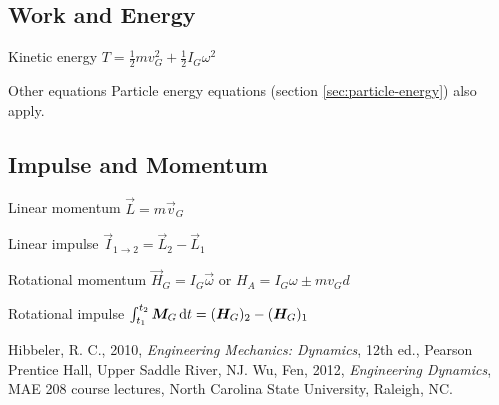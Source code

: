 \documentclass{article}
\begin{document}
\subsection{Work and Energy}
\label{sec:rigid-body-energy}

\begin{description*}
\item[Kinetic energy]
  \(T = \frac12 m v_G^2 + \frac12 I_G \omega^2\)
\item[Other equations] Particle energy equations (section \ref{sec:particle-energy}) also apply.
\end{description*}

\subsection{Impulse and Momentum}
\label{sec:rigid-body-momentum}

\begin{description*}
\item[Linear momentum]
  \(\vec{L} = m\vec{v}_G\)
\item[Linear impulse]
  \(\vec{I}_{1\rightarrow2} = \vec{L}_2 - \vec{L}_1\)
\item[Rotational momentum]
  \(\vec{H}_G = I_G \vec{\omega}\) or
  \(H_A = I_G \omega \pm m v_G d\)
\item[Rotational impulse]
  \(\int_{t_1}^{t_2}\vec{M}_G\dif{t} = (\vec{H}_G)_2 - (\vec{H}_G)_1\)
\end{description*}

\begin{thebibliography}{99}
 Hibbeler, R. C., 2010, \emph{Engineering Mechanics: Dynamics}, 12th ed.,
  Pearson Prentice Hall, Upper Saddle River, NJ.
 Wu, Fen, 2012, \emph{Engineering Dynamics}, MAE 208 course lectures, North Carolina
  State University, Raleigh, NC.
\end{thebibliography}
\end{document}
